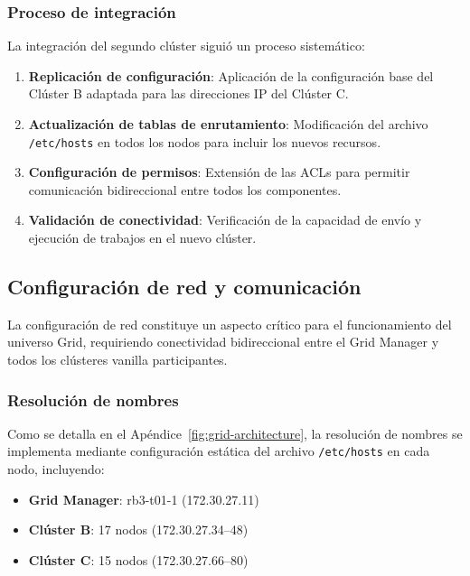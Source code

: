 \subsubsection{Proceso de integración}
\noindent

La integración del segundo clúster siguió un proceso sistemático:

\begin{enumerate}
	\item \textbf{Replicación de configuración}: Aplicación de la configuración base del Clúster B adaptada para las direcciones IP del Clúster C.
	
	\item \textbf{Actualización de tablas de enrutamiento}: Modificación del archivo \texttt{/etc/hosts} en todos los nodos para incluir los nuevos recursos.
	
	\item \textbf{Configuración de permisos}: Extensión de las ACLs para permitir comunicación bidireccional entre todos los componentes.
	
	\item \textbf{Validación de conectividad}: Verificación de la capacidad de envío y ejecución de trabajos en el nuevo clúster.
\end{enumerate}

\subsection{Configuración de red y comunicación}
\noindent

La configuración de red constituye un aspecto crítico para el funcionamiento del universo Grid, requiriendo conectividad bidireccional entre el Grid Manager y todos los clústeres vanilla participantes.

\subsubsection{Resolución de nombres}
\noindent

Como se detalla en el Apéndice~\ref{fig:grid-architecture}, la resolución de nombres se implementa mediante configuración estática del archivo \texttt{/etc/hosts} en cada nodo, incluyendo:

\begin{itemize}
	\item \textbf{Grid Manager}: rb3-t01-1 (172.30.27.11)
	\item \textbf{Clúster B}: 17 nodos (172.30.27.34--48)
	\item \textbf{Clúster C}: 15 nodos (172.30.27.66--80)
\end{itemize}

